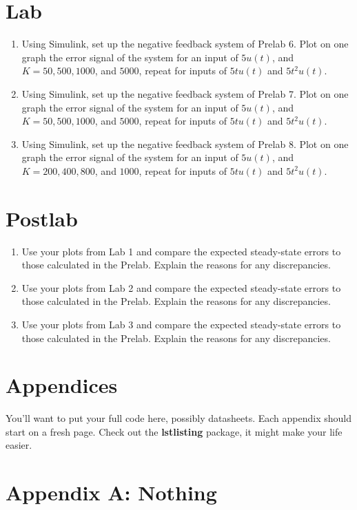 \documentclass[letterpaper,11pt]{texMemo} %
\begin{document}
\section*{Lab}
\begin{enumerate}
    \item Using Simulink, set up the negative feedback system of Prelab 6. Plot on one graph the error signal of the system for an input of $5u(t)$, and $K=50,500,1000$, and $5000$, repeat for inputs of $5t u(t)$ and $5t^{2}u(t)$.
    \item Using Simulink, set up the negative feedback system of Prelab 7. Plot on one graph the error signal of the system for an input of $5u(t)$, and $K=50,500,1000$, and $5000$, repeat for inputs of $5t u(t)$ and $5t^{2}u(t)$.
    \item Using Simulink, set up the negative feedback system of Prelab 8. Plot on one graph the error signal of the system for an input of $5u(t)$, and $K=200,400,800$, and $1000$, repeat for inputs of $5t u(t)$ and $5t^{2}u(t)$.
\end{enumerate}
%

\section*{Postlab}
\begin{enumerate}
    \item Use your plots from Lab 1 and compare the expected steady-state errors to those calculated in the Prelab. Explain the reasons for any discrepancies.
    \item Use your plots from Lab 2 and compare the expected steady-state errors to those calculated in the Prelab. Explain the reasons for any discrepancies.
    \item Use your plots from Lab 3 and compare the expected steady-state errors to those calculated in the Prelab. Explain the reasons for any discrepancies.
\end{enumerate}

\section*{Appendices}
You'll want to put your full code here, possibly datasheets. Each appendix should start on a fresh page. Check out the \textbf{lstlisting} package, it might make your life easier. 
\newpage

\section*{Appendix A: Nothing}

\end{document}
